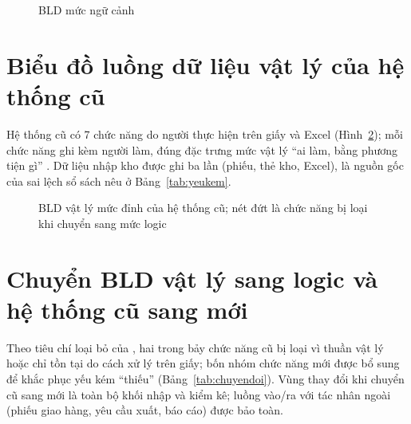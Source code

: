 \begin{figure}[H]
\centering
{}
\caption{BLD mức ngữ cảnh}
\label{fig:ngucanh}
\end{figure}

\section{Biểu đồ luồng dữ liệu vật lý của hệ thống cũ}
\label{sec:bldcu}

Hệ thống cũ có 7 chức năng do người thực hiện trên giấy và Excel (Hình~\ref{fig:bldcu}); mỗi chức năng ghi kèm người làm, đúng đặc trưng mức vật lý “ai làm, bằng phương tiện gì” \cite[Ch.~5]{tung_qlhttt}. Dữ liệu nhập kho được ghi ba lần (phiếu, thẻ kho, Excel), là nguồn gốc của sai lệch sổ sách nêu ở Bảng~\ref{tab:yeukem}.

\begin{figure}[H]
\centering
{}
\caption{BLD vật lý mức đỉnh của hệ thống cũ; nét đứt là chức năng bị loại khi chuyển sang mức logic}
\label{fig:bldcu}
\end{figure}

\section{Chuyển BLD vật lý sang logic và hệ thống cũ sang mới}
\label{sec:chuyendoi}

Theo tiêu chí loại bỏ của \cite[Ch.~5]{tung_qlhttt}, hai trong bảy chức năng cũ bị loại vì thuần vật lý hoặc chỉ tồn tại do cách xử lý trên giấy; bốn nhóm chức năng mới được bổ sung để khắc phục yếu kém “thiếu” (Bảng~\ref{tab:chuyendoi}). Vùng thay đổi khi chuyển cũ sang mới là toàn bộ khối nhập và kiểm kê; luồng vào/ra với tác nhân ngoài (phiếu giao hàng, yêu cầu xuất, báo cáo) được bảo toàn.

